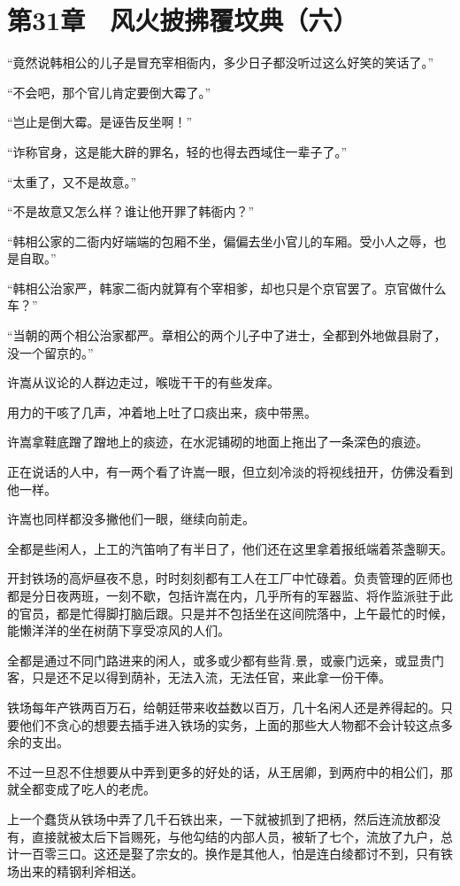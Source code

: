 \section{第31章　风火披拂覆坟典（六）}

“竟然说韩相公的儿子是冒充宰相衙内，多少日子都没听过这么好笑的笑话了。”

“不会吧，那个官儿肯定要倒大霉了。”

“岂止是倒大霉。是诬告反坐啊！”

“诈称官身，这是能大辟的罪名，轻的也得去西域住一辈子了。”

“太重了，又不是故意。”

“不是故意又怎么样？谁让他开罪了韩衙内？”

“韩相公家的二衙内好端端的包厢不坐，偏偏去坐小官儿的车厢。受小人之辱，也是自取。”

“韩相公治家严，韩家二衙内就算有个宰相爹，却也只是个京官罢了。京官做什么车？”

“当朝的两个相公治家都严。章相公的两个儿子中了进士，全都到外地做县尉了，没一个留京的。”

许嵩从议论的人群边走过，喉咙干干的有些发痒。

用力的干咳了几声，冲着地上吐了口痰出来，痰中带黑。

许嵩拿鞋底蹭了蹭地上的痰迹，在水泥铺砌的地面上拖出了一条深色的痕迹。

正在说话的人中，有一两个看了许嵩一眼，但立刻冷淡的将视线扭开，仿佛没看到他一样。

许嵩也同样都没多撇他们一眼，继续向前走。

全都是些闲人，上工的汽笛响了有半日了，他们还在这里拿着报纸端着茶盏聊天。

开封铁场的高炉昼夜不息，时时刻刻都有工人在工厂中忙碌着。负责管理的匠师也都是分日夜两班，一刻不歇，包括许嵩在内，几乎所有的军器监、将作监派驻于此的官员，都是忙得脚打脑后跟。只是并不包括坐在这间院落中，上午最忙的时候，能懒洋洋的坐在树荫下享受凉风的人们。

全都是通过不同门路进来的闲人，或多或少都有些背.景，或豪门远亲，或显贵门客，只是还不足以得到荫补，无法入流，无法任官，来此拿一份干俸。

铁场每年产铁两百万石，给朝廷带来收益数以百万，几十名闲人还是养得起的。只要他们不贪心的想要去插手进入铁场的实务，上面的那些大人物都不会计较这点多余的支出。

不过一旦忍不住想要从中弄到更多的好处的话，从王居卿，到两府中的相公们，那就全都变成了吃人的老虎。

上一个蠢货从铁场中弄了几千石铁出来，一下就被抓到了把柄，然后连流放都没有，直接就被太后下旨赐死，与他勾结的内部人员，被斩了七个，流放了九户，总计一百零三口。这还是娶了宗女的。换作是其他人，怕是连白绫都讨不到，只有铁场出来的精钢利斧相送。

